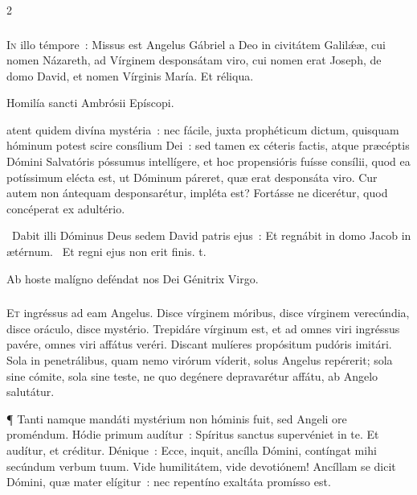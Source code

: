 \documentclass[9pt,twoside]{extarticle}
\begin{document}
\begin{multicols}{2}
{{\subsubsection*{\center {}}
\lettrine{I}n illo témpore~: Missus est Angelus Gábriel a Deo in civitátem Galilǽæ, cui nomen Názareth, ad Vírginem desponsátam viro, cui nomen erat Joseph, de domo David, et nomen Vírginis María. Et réliqua.

\begin{center}Homilía sancti Ambrósii Epíscopi.\\
\end{center}
atent quidem divína mystéria~: nec fácile, juxta prophéticum dictum, quisquam hóminum potest scire consílium Dei~: sed tamen ex céteris factis, atque præcéptis Dómini Salvatóris póssumus intellígere, et hoc propensióris fuísse consílii, quod ea potíssimum elécta est, ut Dóminum páreret, quæ erat desponsáta viro. Cur autem non ántequam desponsarétur, impléta est? Fortásse ne dicerétur, quod concéperat ex adultério.

\begin{tightlist}{}
\item {}~Dabit illi Dóminus Deus sedem David patris ejus~: \textred{*} Et regnábit in domo Jacob in ætérnum. ~Et regni ejus non erit finis. t.
\item {\small {} Ab hoste malígno deféndat nos Dei Génitrix Virgo.}
\item {}
\end{tightlist}

\subsubsection*{\center {}}
\lettrine{E}t ingréssus ad eam Angelus. Disce vírginem móribus, disce vírginem verecúndia, disce oráculo, disce mystério. Trepidáre vírginum est, et ad omnes viri ingréssus pavére, omnes viri affátus veréri. Discant mulíeres propósitum pudóris imitári. Sola in penetrálibus, quam nemo virórum víderit, solus Angelus repérerit; sola sine cómite, sola sine teste, ne quo degénere depravarétur affátu, ab Angelo salutátur.

¶ Tanti namque mandáti mystérium non hóminis fuit, sed Angeli ore proméndum. Hódie primum audítur~: Spíritus sanctus supervéniet in te. Et audítur, et créditur. Dénique~: Ecce, inquit, ancílla Dómini, contíngat mihi secúndum verbum tuum. Vide humilitátem, vide devotiónem! Ancíllam se dicit Dómini, quæ mater elígitur~: nec repentíno exaltáta promísso est.

}}
\end{multicols}
\end{document}
